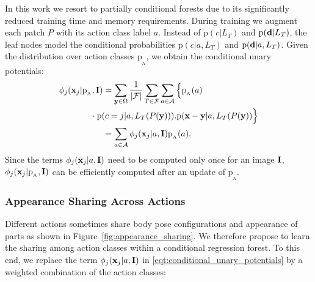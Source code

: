 \documentclass[a4paper, 10pt, conference]{ieeeconf}      \usepackage{FG2017}
\begin{document}
In this work we resort to partially conditional forests due to its significantly reduced training time and memory requirements. 
During training we augment each patch $P$ with its action class label $a$. Instead of $\mathrm{p}(c|L_T)$ and $\mathrm{p}(\bold{d}|L_T)$, the leaf nodes model the conditional probabilities  $\mathrm{p}(c|a,L_T)$ and $\mathrm{p}(\bold{d}|a,L_T)$. Given the distribution over action classes $\mathrm{p_{_A}}$, we obtain the conditional unary potentials:
\begin{align}
\label{eqt:conditional_unary_potentials} 
\nonumber\phi_j(\bold{x}_j|\mathrm{p_{_A}},\bold{I}) &= \sum_{\bold{y} \in \Omega}\dfrac{1}{|\mathcal{F}|} \sum_{T \in \mathcal{F}} \sum_{a \in \mathcal{A}} \Big\{\mathrm{p_{_A}}(a) \\
\nonumber&\hspace{-5mm}\cdot \mathrm{p}(c=j|a,L_T (P(\bold{y}))) . \mathrm{p}(\bold{x}-\bold{y}|a,L_T (P(\bold{y})) \Big\} \\
&= \sum_{a \in \mathcal{A}} \phi_j(\bold{x}_j|a,\bold{I}) \mathrm{p_{_A}}(a).
\end{align}
Since the terms $\phi_j(\bold{x}_j|a,\bold{I})$ need to be computed only once for an image $\bold{I}$, $\phi_j(\bold{x}_j|\mathrm{p_{_A}},\bold{I})$ can be efficiently computed after an update of $\mathrm{p_{_A}}$.  

\subsubsection{Appearance Sharing Across Actions}\label{sec:sharing}
\label{sec:appearance_sharing}

Different actions sometimes share body pose configurations and appearance of parts as shown in Figure~\ref{fig:appearance_sharing}. We therefore propose to learn the sharing among action classes within a conditional regression forest. To this end, we replace the term $\phi_j(\bold{x}_j|a,\bold{I})$ in \eqref{eqt:conditional_unary_potentials} by a weighted combination of the action classes:
\end{document}
